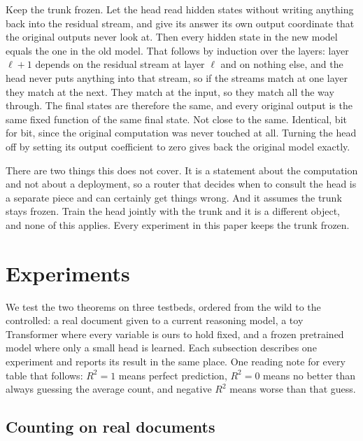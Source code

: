 \documentclass[10pt]{article}
\theoremstyle{definition}
\begin{document}
Keep the trunk frozen. Let the head read hidden states without writing
anything back into the residual stream, and give its answer its own output
coordinate that the original outputs never look at. Then every hidden state
in the new model equals the one in the old model. That follows by induction
over the layers: layer $\ell+1$ depends on the residual stream at layer
$\ell$ and on nothing else, and the head never puts anything into that
stream, so if the streams match at one layer they match at the next. They
match at the input, so they match all the way through. The final states are
therefore the same, and every original output is the same fixed function of
the same final state. Not close to the same. Identical, bit for bit, since
the original computation was never touched at all. Turning the head off by
setting its output coefficient to zero gives back the original model
exactly.

There are two things this does not cover. It is a statement about the
computation and not about a deployment, so a router that decides when to
consult the head is a separate piece and can certainly get things wrong.
And it assumes the trunk stays frozen. Train the head jointly with the
trunk and it is a different object, and none of this applies. Every
experiment in this paper keeps the trunk frozen.

\section{Experiments}
\label{sec:setup}\label{sec:results}

We test the two theorems on three testbeds, ordered from the wild to the
controlled: a real document given to a current reasoning model, a toy
Transformer where every variable is ours to hold fixed, and a frozen
pretrained model where only a small head is learned. Each subsection
describes one experiment and reports its result in the same place. One
reading note for every table that follows: $R^2 = 1$ means perfect
prediction, $R^2 = 0$ means no better than always guessing the average
count, and negative $R^2$ means worse than that guess.

\subsection{Counting on real documents}
\label{sec:realdocs}
\end{document}
